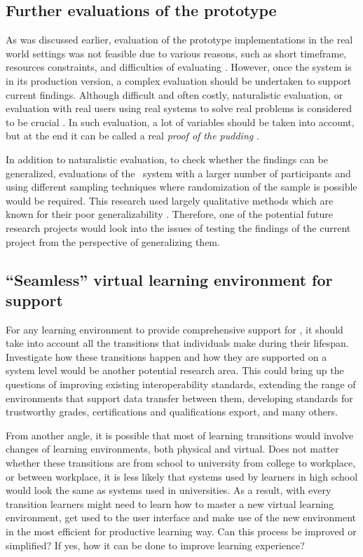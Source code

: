 \subsection{Further evaluations of the prototype}
As was discussed earlier, evaluation of the prototype implementations in the
real world settings was not feasible due to various reasons, such as short
timeframe, resources constraints, and difficulties of evaluating \LLLsn.
However, once the system is in its production version, a complex evaluation
should be undertaken to support current findings. Although difficult and often
costly, naturalistic evaluation, or evaluation with real users using real
systems to solve real problems is considered to be crucial
\citep{Pries-Heje2008}. In such evaluation, a lot of variables should be taken
into account, but at the end it can be called a real \textit{proof of the
pudding} \citep{Venable2010}.

In addition to naturalistic evaluation, to check whether the findings can be
generalized, evaluations of the \ep~system with a larger number of participants
and using different sampling techniques where randomization of the sample is
possible would be required. This research used largely qualitative methods which
are known for their poor generalizability \citep{Trochim2001}. Therefore, one of
the potential future research projects would look into the issues of testing the
findings of the current project from the perspective of generalizing them.

\subsection[``Seamless'' environment for \LLLs support]{``Seamless'' virtual
learning environment for \LLLs support} 
For any learning environment to provide comprehensive support for \LLLs, it
should take into account all the transitions that individuals make during their
lifespan. Investigate how these transitions happen and how they are supported on
a system level would be another potential research area. This could bring up the
questions of improving existing interoperability standards, extending the range
of environments that support data transfer between them, developing standards
for trustworthy grades, certifications and qualifications export, and many
others.

From another angle, it is possible that most of learning transitions would
involve changes of learning environments, both physical and virtual. Does not
matter whether these transitions are from school to university from college to
workplace, or between workplace, it is less likely that systems used by learners
in high school would look the same as systems used in universities. As a result,
with every transition learners might need to learn how to master a new virtual
learning environment, get used to the user interface and make use of the new
environment in the most efficient for productive learning way. Can this process
be improved or simplified? If yes, how it can be done to improve learning
experience?

